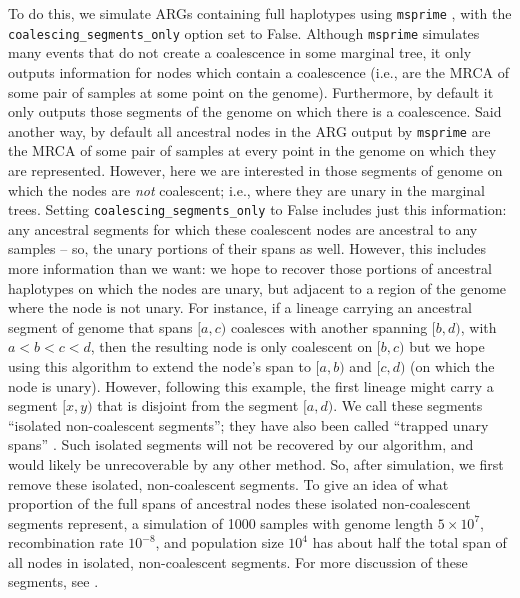 \documentclass[10pt,twoside,lineno]{gsajnl}
\newcommand{\msprime}{\texttt{msprime}}
\begin{document}
To do this, we simulate ARGs containing full haplotypes using \msprime{}
\citep{kelleher2016efficient,baumdicker2021efficient},
with the \texttt{coalescing\_segments\_only} option set to False.
Although \msprime{} simulates many events that do not create a coalescence in some marginal tree,
it only outputs information for nodes which contain a coalescence
(i.e., are the MRCA of some pair of samples at some point on the genome).
Furthermore, by default it only outputs those segments of the genome
on which there is a coalescence.
Said another way, by default all ancestral nodes in the ARG
output by \msprime{} are the MRCA of some pair of samples at every point in the genome
on which they are represented.
However, here we are interested in those segments of genome
on which the nodes are \emph{not} coalescent;
i.e., where they are unary in the marginal trees.
Setting \texttt{coalescing\_segments\_only} to False includes just this information:
any ancestral segments for which these coalescent nodes
are ancestral to any samples -- so, the unary portions of their spans as well.
However, this includes more information than we want:
we hope to recover those portions of ancestral haplotypes
on which the nodes are unary, but adjacent to a region of the genome where the node is not unary.
For instance, if a lineage carrying an ancestral segment of genome that spans $[a, c)$
coalesces with another spanning $[b, d)$, with $a < b < c < d$,
then the resulting node is only coalescent on $[b, c)$ but we hope using this algorithm
to extend the node's span to $[a, b)$ and $[c, d)$
(on which the node is unary).
However, following this example, the first lineage might carry a segment $[x, y)$
that is disjoint from the segment $[a, d)$.
We call these segments ``isolated non-coalescent segments'';
they have also been called ``trapped unary spans'' \citep[by][]{wong2024general}.
Such isolated segments will not be recovered by our algorithm,
and would likely be unrecoverable by any other method.
So, after simulation, we first remove these isolated, non-coalescent segments.
To give an idea of what proportion of the full spans of ancestral nodes
these isolated non-coalescent segments represent,
a simulation of 1000 samples
with genome length $5\times 10^7$, recombination rate $10^{-8}$, and population size $10^4$
has about half the total span of all nodes in isolated, non-coalescent segments.
For more discussion of these segments, see \citet{baumdicker2021efficient}.
\end{document}
